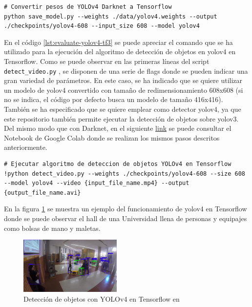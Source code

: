 \vspace{0.5cm}
\begin{lstlisting}[language=iPython,caption=Evaluación del detector de objetos YOLOv4 en Tensorflow (2),captionpos=b,label={lst:evaluate-yolov4-tf2}]
# Convertir pesos de YOLOv4 Darknet a Tensorflow
python save_model.py --weights ./data/yolov4.weights --output ./checkpoints/yolov4-608 --input_size 608 --model yolov4
\end{lstlisting}

En el código \ref{lst:evaluate-yolov4-tf3} se puede apreciar el comando que se ha utilizado para la ejecución del algoritmo de detección de objetos en \gls{yolov4} en Tensorflow. Como se puede observar en las primeras líneas del script \texttt{detect\_video.py} \cite{yolov4-tf-github-original}, se disponen de una serie de flags donde se pueden indicar una gran variedad de parámetros. En este caso, se ha indicado que se quiere utilizar un modelo de \gls{yolov4} convertido con tamaño de redimensionamiento 608x608 (si no se indica, el código por defecto busca un modelo de tamaño 416x416). También se ha especificado que se quiere emplear como detector \gls{yolov4}, ya que este repositorio también permite ejecutar la detección de objetos sobre \gls{yolo}v3. Del mismo modo que con Darknet, en el siguiente \href{https://colab.research.google.com/drive/1ZwcfV2hFZKcsyXaqKp9AGuEi5TY-QwVW?usp=sharing}{link} se puede consultar el Notebook de Google Colab donde se realizan los mismos pasos descritos anteriormente.

\vspace{0.5cm}
\begin{lstlisting}[language=iPython,caption=Evaluación del detector de objetos YOLOv4 en Tensorflow (3),captionpos=b,label={lst:evaluate-yolov4-tf3}]
# Ejecutar algoritmo de deteccion de objetos YOLOv4 en Tensorflow
!python detect_video.py --weights ./checkpoints/yolov4-608 --size 608 --model yolov4 --video {input_file_name.mp4} --output {output_file_name.avi}
\end{lstlisting}

En la figura \ref{fig:detection-yolov4-darknet-gba-far-video3} se muestra un ejemplo del funcionamiento de \gls{yolov4} en Tensorflow donde se puede observar el hall de una Universidad llena de personas y equipajes como bolsas de mano y maletas.

\begin{figure}[ht]
\centering
\includegraphics[width=0.45\textwidth]{img/chapters/desarrollo/GBA-far-video3-detection.jpg}
\caption{\label{fig:detection-yolov4-darknet-gba-far-video3}Detección de objetos con YOLOv4 en Tensorflow en \cite{gba-dataset}}
\end{figure}

